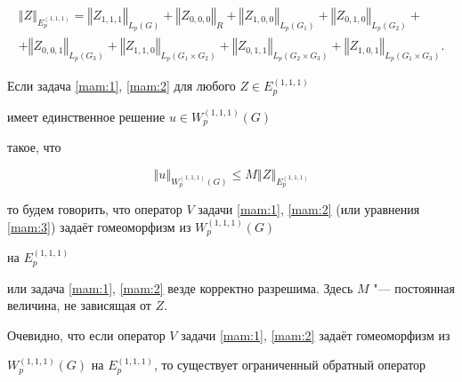 \begin{multline*}

\left\Vert Z\right\Vert _{E_{p}^{(1, 1, 1)}}=\left\Vert Z_{1, 1, 1}\right\Vert

_{L_{p}(G)}+\left\Vert Z_{0, 0, 0}\right\Vert _{R}+\left\Vert

Z_{1, 0, 0}\right\Vert _{L_{p}(G_1 )}+\left\Vert Z_{0, 1, 0}\right\Vert

_{L_{p}(G_2 )}+

\\

+\left\Vert Z_{0,0,1}\right\Vert _{L_{p}(G_3 )}

+\left\Vert

Z_{1, 1, 0}\right\Vert _{L_{p}(G_1 \times G_2 )}+\left\Vert

Z_{0, 1, 1}\right\Vert _{L_{p}(G_2 \times G_3 )}+\left\Vert

Z_{1, 0, 1}\right\Vert _{L_{p}(G_1 \times G_3 )}.

\end{multline*}



\smallskip

\begin{definition} Если задача \eqref{mam:1}, \eqref{mam:2} для любого  $Z\in E_{p}^{(1,1,1)}$

имеет единственное решение $u\in W_{p}^{(1,1,1)}(G)$

такое, что

$$

\left\Vert u\right\Vert _{W_{p}^{(1,1,1)}(G)}\leq M\left\Vert Z\right\Vert

_{E_{p}^{(1,1,1)}}

$$

то будем говорить, что оператор $V$ задачи \eqref{mam:1}, \eqref{mam:2} (или уравнения \eqref{mam:3}) задаёт гомеоморфизм из $W_{p}^{(1, 1, 1)}(G)$

на $E_{p}^{(1, 1, 1)}$

или задача \eqref{mam:1}, \eqref{mam:2} везде корректно разрешима. Здесь $M$ "--- постоянная величина, не зависящая от $Z$.

\end{definition}



\smallskip



Очевидно, что если оператор $V$ задачи \eqref{mam:1}, \eqref{mam:2} задаёт гомеоморфизм из

$W_{p}^{(1, 1, 1)}(G)$ на $E_{p}^{(1, 1, 1)}$, то существует ограниченный обратный оператор

